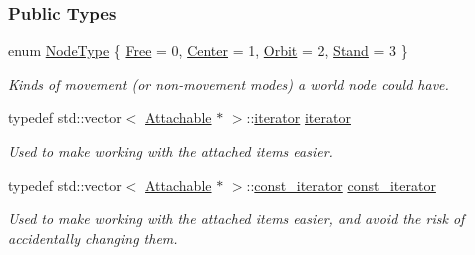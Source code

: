 \subsubsection*{Public Types}
\begin{DoxyCompactItemize}
\item 
enum \hyperlink{classphys_1_1WorldNode_a0b178b06aa411b00c4c2ccd926d9bf5a}{NodeType} \{ \hyperlink{classphys_1_1WorldNode_a0b178b06aa411b00c4c2ccd926d9bf5aaa4f848b95586fc581aa1f749c82a1fb5}{Free} =  0, 
\hyperlink{classphys_1_1WorldNode_a0b178b06aa411b00c4c2ccd926d9bf5aa06be3334346d6ba7913197ee0dd5b8bb}{Center} =  1, 
\hyperlink{classphys_1_1WorldNode_a0b178b06aa411b00c4c2ccd926d9bf5aae9751e5fc4396425fbd7b93171541a22}{Orbit} =  2, 
\hyperlink{classphys_1_1WorldNode_a0b178b06aa411b00c4c2ccd926d9bf5aa2ae400375e79106ae01adf39dd5c1185}{Stand} =  3
 \}
\begin{DoxyCompactList}\small\item\em Kinds of movement (or non-\/movement modes) a world node could have. \item\end{DoxyCompactList}\item 
\hypertarget{classphys_1_1WorldNode_ad7f553f256c4e500e35c36196db26287}{
typedef std::vector$<$ \hyperlink{classphys_1_1Attachable}{Attachable} $\ast$ $>$::\hyperlink{classphys_1_1WorldNode_ad7f553f256c4e500e35c36196db26287}{iterator} \hyperlink{classphys_1_1WorldNode_ad7f553f256c4e500e35c36196db26287}{iterator}}
\label{d2/d3e/classphys_1_1WorldNode_ad7f553f256c4e500e35c36196db26287}

\begin{DoxyCompactList}\small\item\em Used to make working with the attached items easier. \item\end{DoxyCompactList}\item 
\hypertarget{classphys_1_1WorldNode_a76139100e549fd31310cd1bed75338ba}{
typedef std::vector$<$ \hyperlink{classphys_1_1Attachable}{Attachable} $\ast$ $>$::\hyperlink{classphys_1_1WorldNode_a76139100e549fd31310cd1bed75338ba}{const\_\-iterator} \hyperlink{classphys_1_1WorldNode_a76139100e549fd31310cd1bed75338ba}{const\_\-iterator}}
\label{d2/d3e/classphys_1_1WorldNode_a76139100e549fd31310cd1bed75338ba}

\begin{DoxyCompactList}\small\item\em Used to make working with the attached items easier, and avoid the risk of accidentally changing them. \item\end{DoxyCompactList}\end{DoxyCompactItemize}
